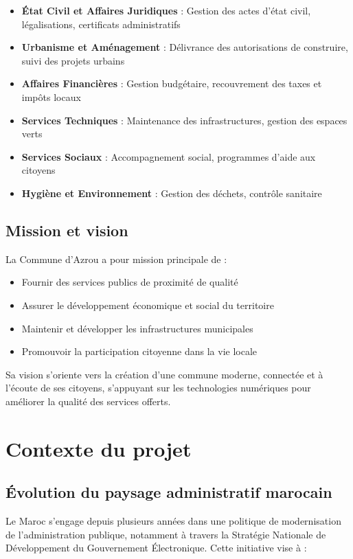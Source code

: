 \begin{itemize}
\item \textbf{État Civil et Affaires Juridiques} : Gestion des actes d'état civil, légalisations, certificats administratifs
\item \textbf{Urbanisme et Aménagement} : Délivrance des autorisations de construire, suivi des projets urbains
\item \textbf{Affaires Financières} : Gestion budgétaire, recouvrement des taxes et impôts locaux
\item \textbf{Services Techniques} : Maintenance des infrastructures, gestion des espaces verts
\item \textbf{Services Sociaux} : Accompagnement social, programmes d'aide aux citoyens
\item \textbf{Hygiène et Environnement} : Gestion des déchets, contrôle sanitaire
\end{itemize}

\subsection{Mission et vision}

La Commune d'Azrou a pour mission principale de :
\begin{itemize}
\item Fournir des services publics de proximité de qualité
\item Assurer le développement économique et social du territoire
\item Maintenir et développer les infrastructures municipales
\item Promouvoir la participation citoyenne dans la vie locale
\end{itemize}

Sa vision s'oriente vers la création d'une commune moderne, connectée et à l'écoute de ses citoyens, s'appuyant sur les technologies numériques pour améliorer la qualité des services offerts.

\section{Contexte du projet}

\subsection{Évolution du paysage administratif marocain}

Le Maroc s'engage depuis plusieurs années dans une politique de modernisation de l'administration publique, notamment à travers la Stratégie Nationale de Développement du Gouvernement Électronique. Cette initiative vise à :


